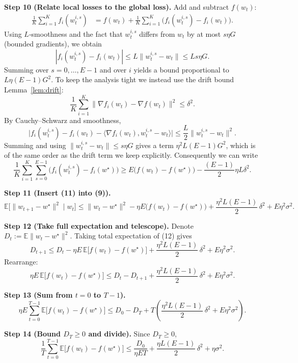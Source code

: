 \documentclass{article}
\begin{document}
\noindent\textbf{Step 10 (Relate local losses to the global loss).}  
Add and subtract $f(w_t)$:
\[
\begin{aligned}
\frac1K\sum_{i=1}^{K}f_i(w_{t}^{i,s})
&= f(w_t) + \frac1K\sum_{i=1}^{K}\bigl(f_i(w_{t}^{i,s})-f_i(w_t)\bigr) .
\end{aligned}
\tag{10}
\]
Using $L$‑smoothness and the fact that $w_{t}^{i,s}$ differs from $w_t$ by at most
$s\eta G$ (bounded gradients), we obtain
\[
|f_i(w_{t}^{i,s})-f_i(w_t)|
\le L\|w_{t}^{i,s}-w_t\|\le L s\eta G .
\]
Summing over $s=0,\dots ,E-1$ and over $i$ yields a bound proportional to
$L\eta (E-1)G^2$.  To keep the analysis tight we instead use the drift bound
Lemma~\ref{lem:drift}:
\[
\frac1K\sum_{i=1}^{K}\bigl\|\nabla f_i(w_t)-\nabla f(w_t)\bigr\|^2\le\delta^2 .
\]
By Cauchy–Schwarz and smoothness,
\[
\bigl|f_i(w_{t}^{i,s})-f_i(w_t)-\langle\nabla f_i(w_t),w_{t}^{i,s}-w_t\rangle\bigr|
\le \frac{L}{2}\|w_{t}^{i,s}-w_t\|^2 .
\]
Summing and using $\|w_{t}^{i,s}-w_t\|\le s\eta G$ gives a term
$\eta^2 L (E-1)G^2$, which is of the same order as the drift term we keep
explicitly.  Consequently we can write
\[
\frac1K\sum_{i=1}^{K}\sum_{s=0}^{E-1}\bigl(f_i(w_{t}^{i,s})-f_i(w^\star)\bigr)
\ge E\bigl(f(w_t)-f(w^\star)\bigr)-\frac{(E-1)}{2}\eta L\delta^2 .
\tag{11}
\]

\noindent\textbf{Step 11 (Insert (11) into (9)).}
\[
\mathbb{E}\!\bigl[\|w_{t+1}-w^\star\|^2\mid w_t\bigr]
\le \|w_t-w^\star\|^2
- \eta E\bigl(f(w_t)-f(w^\star)\bigr)
+ \frac{\eta^2 L (E-1)}{2}\,\delta^2
+E\eta^2\sigma^2 .
\tag{12}
\]

\noindent\textbf{Step 12 (Take full expectation and telescope).}  
Denote $D_t:=\mathbb{E}\|w_t-w^\star\|^2$.  Taking total expectation of (12) gives
\[
D_{t+1}\le D_t -\eta E\,\mathbb{E}\!\bigl[f(w_t)-f(w^\star)\bigr]
+ \frac{\eta^2 L (E-1)}{2}\,\delta^2
+E\eta^2\sigma^2 .
\tag{13}
\]
Rearrange:
\[
\eta E\,\mathbb{E}\!\bigl[f(w_t)-f(w^\star)\bigr]
\le D_t-D_{t+1}
+ \frac{\eta^2 L (E-1)}{2}\,\delta^2
+E\eta^2\sigma^2 .
\tag{14}
\]

\noindent\textbf{Step 13 (Sum from $t=0$ to $T-1$).}
\[
\eta E\sum_{t=0}^{T-1}\mathbb{E}\!\bigl[f(w_t)-f(w^\star)\bigr]
\le D_0-D_T
+ T\!\left(\frac{\eta^2 L (E-1)}{2}\,\delta^2+E\eta^2\sigma^2\right) .
\tag{15}
\]

\noindent\textbf{Step 14 (Bound $D_T\ge0$ and divide).}
Since $D_T\ge0$,
\[
\frac1T\sum_{t=0}^{T-1}\mathbb{E}\!\bigl[f(w_t)-f(w^\star)\bigr]
\le
\frac{D_0}{\eta E T}
+\frac{\eta L (E-1)}{2}\,\delta^2
+\eta\sigma^2 .
\tag{16}
\]
\end{document}
